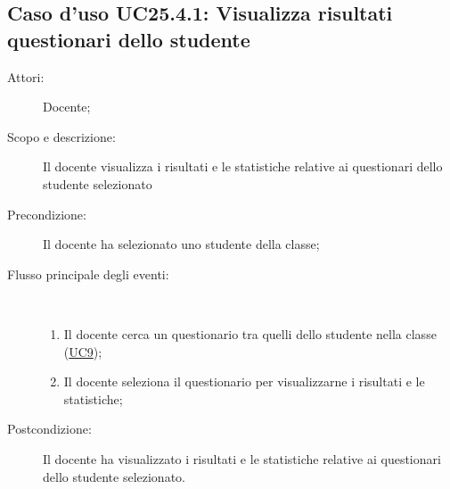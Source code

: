 \subsection{Caso d'uso UC25.4.1: Visualizza risultati questionari dello studente}\begin{description}
\item[Attori:] Docente;
\item[Scopo e descrizione:] Il docente visualizza i risultati e le statistiche relative ai questionari dello studente selezionato
      \item[Precondizione:] Il docente ha selezionato uno studente della classe;

        \item[Flusso principale degli eventi:] \ 
 \begin{enumerate}
          \item Il docente cerca un questionario tra quelli dello studente nella classe (\hyperlink{UC9}{UC9});
          \item Il docente seleziona il questionario per visualizzarne i risultati e le statistiche;

      \end{enumerate}
    \item[Postcondizione:] Il docente ha visualizzato i risultati e le statistiche relative ai questionari dello studente selezionato.
  \end{description}
\hypertarget{UC26}{}
